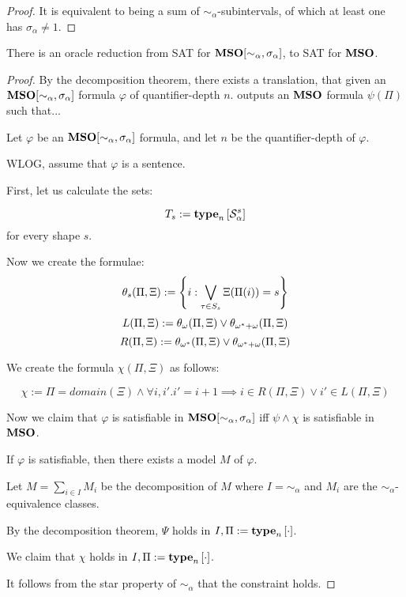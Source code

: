 \begin{proof}
  It is equivalent to being a sum of $\sim_{\alpha}$-subintervals,
  of which at least one has $\sigma_{\alpha} \ne 1$.
\end{proof}

\begin{theorem}
  There is an oracle reduction from SAT for $\mathbf{MSO}[\sim_{\alpha}, \sigma_{\alpha}]$,
  to SAT for $\mathbf{MSO}$.
\end{theorem}

\begin{proof}
  By the decomposition theorem, there exists a translation,
  that given an $\mathbf{MSO}[\sim_{\alpha}, \sigma_{\alpha}]$ formula $\varphi$ of quantifier-depth $n$.
  outputs an $\mathbf{MSO}$ formula $\psi(\Pi)$ such that...

  Let $\varphi$ be an $\mathbf{MSO}[\sim_{\alpha}, \sigma_{\alpha}]$ formula,
  and let $n$ be the quantifier-depth of $\varphi$.

  WLOG, assume that $\varphi$ is a sentence.

  First, let us calculate the sets:

  \[T_s := \mathbf{type}_{n} \left[ {\mathcal{S}^{s}_{\alpha}} \right]\]
  for every shape $s$.

  Now we create the formulae:
  \[\theta_s(\Pi, \Xi) := \left\{ {i : \bigvee_{\tau \in S_s}{\Xi(\Pi(i)) = s}} \right\}\]
  \[L(\Pi, \Xi) := \theta_{\omega}(\Pi, \Xi) \vee \theta_{\omega^\ast + \omega}(\Pi, \Xi)\]
  \[R(\Pi, \Xi) := \theta_{\omega^\ast}(\Pi, \Xi) \vee \theta_{\omega^\ast + \omega}(\Pi, \Xi)\]

  We create the formula $\chi(\Pi, \Xi)$ as follows:

  \[\chi := \Pi = domain(\Xi) \wedge \forall i, i'. i' = i + 1 \implies {i \in R(\Pi, \Xi) \vee i' \in L(\Pi, \Xi)}\]

  Now we claim that $\varphi$ is satisfiable in $\mathbf{MSO}[\sim_{\alpha}, \sigma_{\alpha}]$
  iff $\psi \land \chi$ is satisfiable in $\mathbf{MSO}$.

  If $\varphi$ is satisfiable, then there exists a model $M$ of $\varphi$.

  Let $M = \sum_{i \in I} M_i$ be the decomposition of $M$
  where $I = \sim_{\alpha}$ and $M_i$ are the $\sim_{\alpha}$-equivalence classes.

  By the decomposition theorem, $\Psi$ holds
  in $I, \Pi := \mathbf{type}_{n} \left[ {\cdot} \right]$.

  We claim that $\chi$ holds in $I, \Pi := \mathbf{type}_{n} \left[ {\cdot} \right]$.

  It follows from the star property of $\sim_{\alpha}$ that the constraint holds.


\end{proof}
